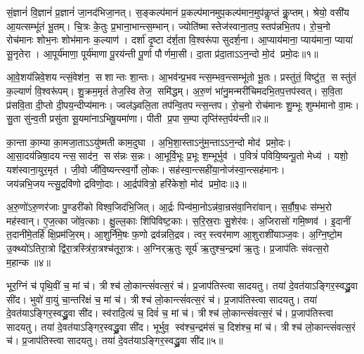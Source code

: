 \setcounter{anuvakam}{0}

   सं॒ज्ञानं॑ वि॒ज्ञानं॑ प्र॒ज्ञानं॑ जा॒नद॑भिजा॒नत्।
   स॒ङ्कल्प॑मानं प्र॒कल्प॑मानमुप॒\-कल्प॑मान॒मुप॑कॢप्तं कॢ॒प्तम्।
   श्रेयो॒ वसी॑य आ॒यत्सम्भू॑तं भू॒तम्।
   चि॒त्रः के॒तुः प्र॒भाना॒भान्त्स॒म्भान्।
   ज्योति॑ष्मास्तेज॑स्वाना॒तप॒स्तप॑न्नभि॒\-तप\sn{}।
   रो॒च॒नो रोच॑मानः शोभ॒नः शोभ॑मानः क॒ल्याण॑।
   दर्\mbox{}शा॑ दृ॒ष्टा द॑र्\mbox{}श॒ता वि॒श्वरू॑पा सुदर्\mbox{}श॒ना।
   आ॒प्याय॑माना॒ प्याय॑माना॒ प्याया॑ सू॒नृतेरा।
   आ॒पूर्य॑माणा॒ पूर्य॑माणा पू॒रय॑न्ती पू॒र्णा पौर्णमा॒सी।
   दा॒ता प्र॑दा॒ताऽऽन॒न्दो मो॒द॑ प्रमो॒दः॥१॥

   आ॒वे॒शय॑न्निवे॒शयन्त्सं॒वेश॑न॒ सशान्तः शा॒न्तः।
   आ॒भव॑न्प्र॒भवन्त्\-स॒म्भव॒न्त्सम्भू॑तो भू॒तः।
   प्रस्तु॑तं॒ विष्टु॑त॒ सस्तु॑तं क॒ल्याणं॑ वि॒श्वरू॑पम्।
   शु॒क्रम॒मृतं॑ तेज॒स्वि तेज॒ समि॑द्धम्।
   अ॒रु॒णं भा॑नु॒मन्मरी॑चिमदभि॒तप॒त्तप॑स्वत्।
   स॒वि॒ता प्र॑सवि॒ता दी॒प्तो दी॒पय॒न्दीप्य॑मानः।
   ज्वल॑ञ्ज्वलि॒ता तप॑न्वि॒तपन्त्स॒न्तप\sn{}।
   रो॒च॒नो रोच॑मानः शु॒म्भूः शुम्भ॑मानो वा॒मः।
   सु॒ता सु॑न्व॒ती प्रसु॑ता सू॒यमा॑नाऽभिषू॒यमा॑णा।
   पीती प्र॒पा स॒म्पा तृप्ति॑स्त॒र्पय॑न्ती॥२॥

   का॒न्ता का॒म्या का॒मजा॒ताऽऽयु॑ष्मती काम॒दुघा।
   अ॒भि॒शा॒स्ताऽ\-नु॑म॒न्ताऽऽन॒न्दो मोद॑ प्रमो॒दः।
   आ॒सा॒दय॑न्निषा॒\-दयन्त्स॒साद॑न॒ सस॑न्नः स॒न्नः।
   आ॒भूर्वि॒भूः प्र॒भूः श॒म्भूर्भुव॑।
   प॒वित्रं॑ पवियि॒ष्यन्पू॒तो मेध्य॑।
   यशो॒ यश॑स्वाना॒युर॒मृत॑।
   जी॒वो जी॑वि॒ष्यन्त्स्व॒र्गो लो॒कः।
   सह॑स्वा॒न्त्सही॑या॒नोज॑स्वा॒न्त्सह॑मानः।
   जय॑न्नभि॒जयन्त्सु॒\-द्रवि॑णो द्रविणो॒दाः।
   आ॒र्द्रप॑वित्रो॒ हरि॑केशो॒ मोद॑ प्रमो॒दः॥३॥

   अ॒रु॒णो॑ऽरु॒णर॑जाः पु॒ण्डरी॑को विश्व॒जिद॑भि॒जित्।
   आ॒र्द्रः पिन्व॑मा॒नोऽन्न॑वा॒न्रस॑वा॒निरा॑वान्।
   स॒र्वौ॒ष॒धः स॑म्भ॒रो मह॑स्वान्।
   ए॒ज॒त्का जो॑व॒त्काः।
   क्षु॒ल्ल॒काः शि॑पिविष्ट॒काः।
   स॒रि॒स्र॒राः सु॒शेर॑वः।
   अ॒जिरासो॑ गमि॒ष्णव॑।
   इ॒दानीं त॒दानी॑मे॒तर्\-\mbox{हि॑} क्षि॒प्रम॑जि॒रम्।
   आ॒शुर्नि॑मे॒षः फ॒णो द्रव॑न्नति॒द्रव।
   त्वर॒स्त्वर॑माण आ॒शुराशी॑याञ्ज॒वः।
   अ॒ग्नि॒ष्टो॒म उ॒क्थ्यो॑ऽतिरा॒त्रो द्वि॑रा॒त्रस्त्रि॑रा॒त्रश्च॑तूरा॒त्रः।
   अ॒ग्निर्{‌}ऋ॒तुः सूर्य॑ ऋ॒तुश्च॒न्द्रमा॑ ऋ॒तुः।
   प्र॒जाप॑तिः संवत्स॒रो म॒हान्क॥४॥
   \anuvakamend
   
   भूर॒ग्निं च॑ पृथि॒वीं च॒ मां च॑।
   त्रीश्च॑ लो॒कान्त्सं॑वत्स॒रं च॑।
   प्र॒जाप॑तिस्त्वा सादयतु।
   तया॑ दे॒वत॑याऽङ्गिर॒स्वद्ध्रु॒वा सी॑द।
   भुवो॑ वा॒युं चा॒न्तरि॑क्षं च॒ मां च॑।
   त्रीश्च॑ लो॒कान्त्सं॑वत्स॒रं च॑।
   प्र॒जाप॑तिस्त्वा सादयतु।
   तया॑ दे॒वत॑याऽङ्गिर॒स्वद्ध्रु॒वा सी॑द।
   स्व॑रादि॒त्यं च॒ दिवं॑ च॒ मां च॑।
   त्रीश्च॑ लो॒कान्त्सं॑वत्स॒रं च॑।
   प्र॒जाप॑तिस्त्वा सादयतु।
   तया॑ दे॒वत॑याऽङ्गिर॒स्वद्ध्रु॒वा सी॑द।
   भूर्भुव॒ स्व॑श्च॒न्द्रम॑सं च॒ दिश॑श्च॒ मां च॑।
   त्रीश्च॑ लो॒कान्त्सं॑वत्स॒रं च॑।
   प्र॒जाप॑तिस्त्वा सादयतु।
   तया॑ दे॒वत॑याऽङ्गिर॒स्वद्ध्रु॒वा सी॑द॥५॥
   \anuvakamend
   
